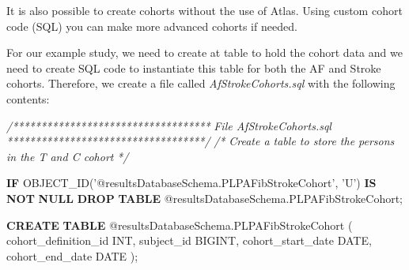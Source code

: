 \documentclass[]{article}
\newenvironment{Shaded}{\begin{snugshade}}{\end{snugshade}}
\newcommand{\KeywordTok}[1]{\textcolor[rgb]{0.13,0.29,0.53}{\textbf{#1}}}
\newcommand{\DataTypeTok}[1]{\textcolor[rgb]{0.13,0.29,0.53}{#1}}
\newcommand{\StringTok}[1]{\textcolor[rgb]{0.31,0.60,0.02}{#1}}
\newcommand{\CommentTok}[1]{\textcolor[rgb]{0.56,0.35,0.01}{\textit{#1}}}
\newcommand{\NormalTok}[1]{#1}
\begin{document}
It is also possible to create cohorts without the use of Atlas. Using
custom cohort code (SQL) you can make more advanced cohorts if needed.

For our example study, we need to create at table to hold the cohort
data and we need to create SQL code to instantiate this table for both
the AF and Stroke cohorts. Therefore, we create a file called
\emph{AfStrokeCohorts.sql} with the following contents:

\begin{Shaded}
\begin{Highlighting}[]
\CommentTok{/***********************************}
\CommentTok{File AfStrokeCohorts.sql }
\CommentTok{***********************************/}
\CommentTok{/*}
\CommentTok{  Create a table to store the persons in the T and C cohort}
\CommentTok{*/}

\KeywordTok{IF}\NormalTok{ OBJECT_ID(}\StringTok{'@resultsDatabaseSchema.PLPAFibStrokeCohort'}\NormalTok{, }\StringTok{'U'}\NormalTok{) }\KeywordTok{IS} \KeywordTok{NOT} \KeywordTok{NULL} 
  \KeywordTok{DROP} \KeywordTok{TABLE}\NormalTok{ @resultsDatabaseSchema.PLPAFibStrokeCohort;}

\KeywordTok{CREATE} \KeywordTok{TABLE}\NormalTok{ @resultsDatabaseSchema.PLPAFibStrokeCohort }
\NormalTok{( }
\NormalTok{  cohort_definition_id }\DataTypeTok{INT}\NormalTok{, }
\NormalTok{  subject_id BIGINT,}
\NormalTok{  cohort_start_date }\DataTypeTok{DATE}\NormalTok{, }
\NormalTok{  cohort_end_date }\DataTypeTok{DATE}
\NormalTok{);}



\end{Highlighting}
\end{Shaded}
\end{document}

